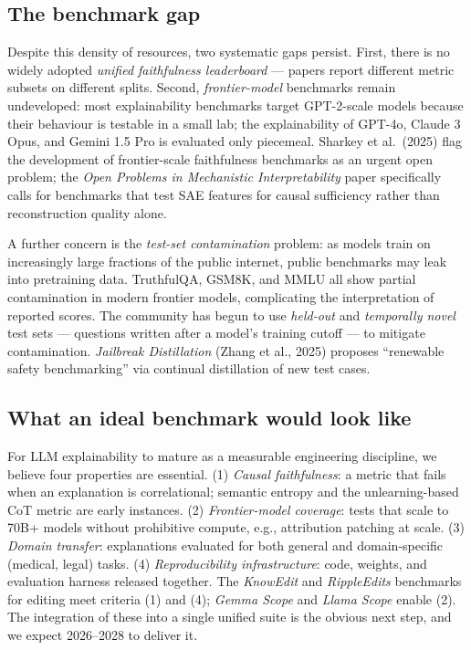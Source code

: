 \subsection{The benchmark gap}\label{the-benchmark-gap}

Despite this density of resources, two systematic gaps persist. First, there is no widely adopted \emph{unified faithfulness leaderboard} --- papers report different metric subsets on different splits. Second, \emph{frontier-model} benchmarks remain undeveloped: most explainability benchmarks target GPT-2-scale models because their behaviour is testable in a small lab; the explainability of GPT-4o, Claude 3 Opus, and Gemini 1.5 Pro is evaluated only piecemeal. Sharkey et al.~(2025) flag the development of frontier-scale faithfulness benchmarks as an urgent open problem; the \emph{Open Problems in Mechanistic Interpretability} paper specifically calls for benchmarks that test SAE features for causal sufficiency rather than reconstruction quality alone.

A further concern is the \emph{test-set contamination} problem: as models train on increasingly large fractions of the public internet, public benchmarks may leak into pretraining data. TruthfulQA, GSM8K, and MMLU all show partial contamination in modern frontier models, complicating the interpretation of reported scores. The community has begun to use \emph{held-out} and \emph{temporally novel} test sets --- questions written after a model's training cutoff --- to mitigate contamination. \emph{Jailbreak Distillation} (Zhang et al., 2025) proposes ``renewable safety benchmarking'' via continual distillation of new test cases.

\subsection{What an ideal benchmark would look like}\label{what-an-ideal-benchmark-would-look-like}

For LLM explainability to mature as a measurable engineering discipline, we believe four properties are essential. (1) \emph{Causal faithfulness}: a metric that fails when an explanation is correlational; semantic entropy and the unlearning-based CoT metric are early instances. (2) \emph{Frontier-model coverage}: tests that scale to 70B+ models without prohibitive compute, e.g., attribution patching at scale. (3) \emph{Domain transfer}: explanations evaluated for both general and domain-specific (medical, legal) tasks. (4) \emph{Reproducibility infrastructure}: code, weights, and evaluation harness released together. The \emph{KnowEdit} and \emph{RippleEdits} benchmarks for editing meet criteria (1) and (4); \emph{Gemma Scope} and \emph{Llama Scope} enable (2). The integration of these into a single unified suite is the obvious next step, and we expect 2026--2028 to deliver it.

